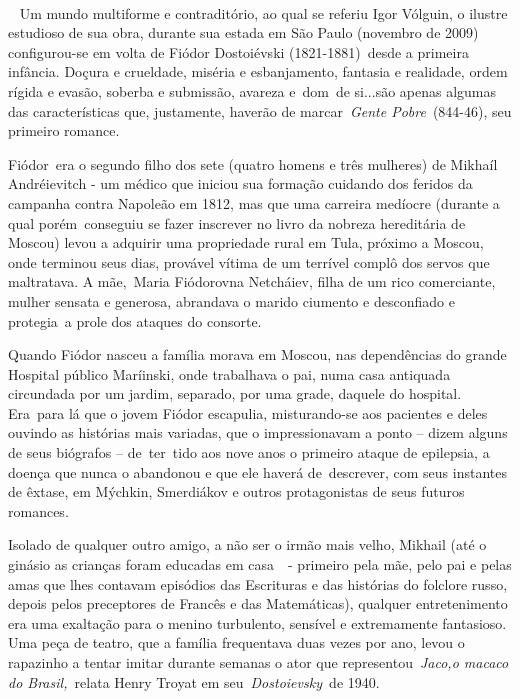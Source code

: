 \textbf{~}

~ Um mundo multiforme e contraditório, ao qual se referiu Igor Vólguin,
o ilustre estudioso de sua obra, durante sua estada em São Paulo
(novembro de 2009) configurou-se em volta de Fiódor Dostoiévski
(1821-1881)~desde a primeira infância. Doçura e crueldade, miséria e
esbanjamento, fantasia e realidade, ordem rígida e evasão, soberba e
submissão, avareza e~dom~de si...são apenas algumas das características
que, justamente, haverão de marcar~\emph{Gente Pobre}~(844-46), seu
primeiro romance.

Fiódor~era o segundo filho dos sete (quatro homens e três mulheres) de
Mikhaíl Andréievitch - um médico que iniciou sua formação cuidando dos
feridos da campanha contra Napoleão em 1812, mas que uma carreira
medíocre (durante a qual porém~conseguiu se fazer inscrever no livro da
nobreza hereditária de Moscou) levou a adquirir uma propriedade rural em
Tula, próximo a Moscou, onde terminou seus dias, provável vítima de um
terrível complô dos servos que maltratava. A mãe,~Maria Fiódorovna
Netcháiev, filha de um rico comerciante, mulher sensata e generosa,
abrandava o marido ciumento e desconfiado e protegia~a prole dos ataques
do consorte.

Quando Fiódor nasceu a família morava em Moscou, nas dependências do
grande Hospital público Maríinski, onde trabalhava o pai, numa casa
antiquada circundada por um jardim, separado, por uma grade, daquele do
hospital. Era~para lá que o jovem Fiódor escapulia, misturando-se aos
pacientes e deles ouvindo as histórias mais variadas, que o
impressionavam a ponto -- dizem alguns de seus biógrafos -- de~ter~tido
aos nove anos o primeiro ataque de epilepsia, a doença que nunca o
abandonou e que ele haverá de~descrever, com seus instantes de êxtase,
em Mýchkin, Smerdiákov e outros protagonistas de seus futuros romances.

Isolado de qualquer outro amigo, a não ser o irmão mais velho, Mikhail
(até o ginásio as crianças foram educadas em casa~~- primeiro pela mãe,
pelo pai e pelas amas que lhes contavam episódios das Escrituras e das
histórias do folclore russo, depois pelos preceptores de Francês e das
Matemáticas), qualquer entretenimento era uma exaltação para o menino
turbulento, sensível e extremamente fantasioso. Uma peça de teatro, que
a família frequentava duas vezes por ano, levou o rapazinho a tentar
imitar durante semanas o ator que representou~\emph{Jaco,o macaco do
Brasil,~}relata Henry Troyat em seu~\emph{Dostoievsky~}de 1940.

